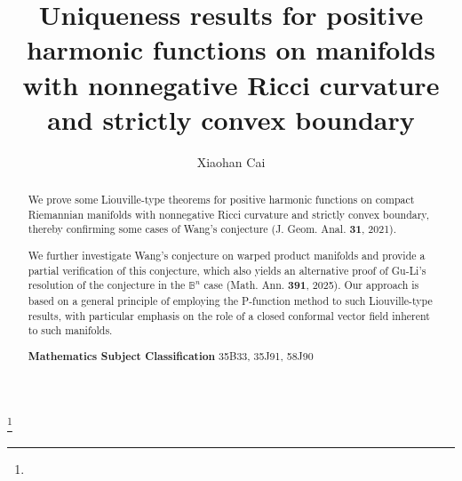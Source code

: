 \documentclass[12pt]{amsart}%
\numberwithin{equation}{section}
\numberwithin{lemma}{section}
\numberwithin{proposition}{section}
\numberwithin{corollary}{section}
\numberwithin{remark}{section}
\begin{document}
\title[Uniqueness results on manifolds with boundary]{Uniqueness results for positive harmonic functions on manifolds with nonnegative Ricci curvature and strictly convex boundary}
\author{Xiaohan Cai}
\address{School of Mathematical Sciences, Shanghai Jiao Tong University, Shanghai 200240, China}


\thanks{}
\date{}

\begin{abstract}
We prove some Liouville-type theorems for positive harmonic functions on compact Riemannian manifolds with nonnegative Ricci curvature and strictly convex boundary, thereby confirming some cases of Wang's conjecture (J. Geom. Anal. \textbf{31}, 2021). 

We further investigate Wang's conjecture on warped product manifolds and provide a partial verification of this conjecture,
which also yields an alternative proof of Gu-Li's resolution of the conjecture in the $\mathbb{B}^n$ case (Math. Ann. \textbf{391}, 2025). Our approach is based on a general principle of employing the P-function method to such Liouville-type results, with particular emphasis on the role of a closed conformal vector field inherent to such manifolds. 
\vspace{1em}

\noindent\textbf{Mathematics Subject Classification} 35B33, 35J91, 58J90
\end{abstract}
\maketitle
\end{document}
